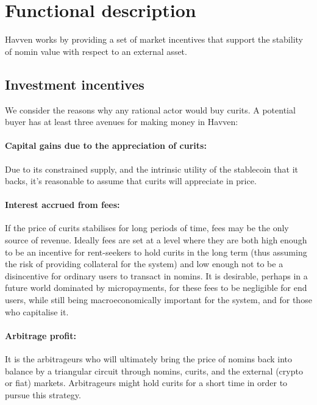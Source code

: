 \section{Functional description}

Havven works by providing a set of market incentives that support the stability of nomin value with respect to an external asset.


\subsection{Investment incentives}

We consider the reasons why any rational actor would buy curits. A potential buyer has at least three avenues for making money in Havven:

\paragraph{Capital gains due to the appreciation of curits:}
Due to its constrained supply, and the intrinsic utility of the stablecoin that it backs, it's reasonable to assume that
curits will appreciate in price.

\paragraph{Interest accrued from fees:}
If the price of curits stabilises for long periods of time, fees may be the only source of revenue. Ideally fees are set at a level where they are both high enough to be an incentive for rent-seekers to hold curits in the long term (thus assuming the risk of providing collateral for the system) and low enough not to be a disincentive for ordinary users to transact in nomins.
It is desirable, perhaps in a future world dominated by micropayments, for these fees to be negligible for end users, while still being macroeconomically important for the system, and for those who capitalise it.

\paragraph{Arbitrage profit:}
It is the arbitrageurs who will ultimately bring the price of nomins back into balance by a triangular circuit through nomins, curits, and the external (crypto or fiat) markets. Arbitrageurs might hold curits for a short time in order to pursue this strategy.


